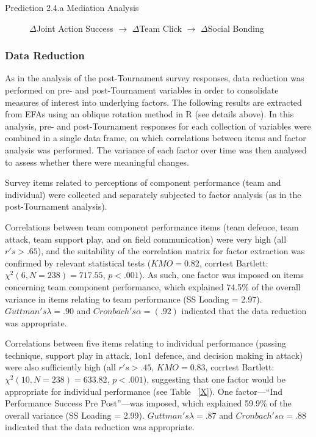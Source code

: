 \begin{description}
  \item[Prediction 2.4.a Mediation Analysis] $\Delta$Joint Action Success $\rightarrow$ $\Delta$Team Click $\rightarrow$ $\Delta$Social Bonding
\end{description}

\clearpage










\subsubsection{Data Reduction}
As in the analysis of the post-Tournament survey responses, data reduction was performed on pre- and post-Tournament variables in order to consolidate measures of interest into underlying factors. The following results are extracted from EFAs using an oblique rotation method in R (see details above). In this analysis, pre- and post-Tournament responses for each collection of variables were combined in a single data frame, on which correlations between items and factor analysis was performed.  The variance of each factor over time was then analysed to assess whether there were meaningful changes.


Survey items related to perceptions of component performance (team and individual) were collected and separately subjected to factor analysis (as in the post-Tournament analysis).

Correlations between team component performance items (team defence, team attack, team support play, and on field communication) were very high (all $r's > .65$), and the suitability of the correlation matrix for factor extraction was confirmed by relevant statistical tests ($KMO = 0.82$, corrtest Bartlett: $\chi^2(6, N = 238) = 717.55$, $p < .001$).  As such, one factor was imposed on items concerning team component performance, which explained 74.5\% of the overall variance in items relating to team performance (SS Loading = 2.97). $Guttman's \lambda =.90$ and $Cronbach's \alpha = (.92)$ indicated that the data reduction was appropriate.

Correlations between five items relating to individual performance (passing technique, support play in attack, 1on1 defence, and decision making in attack) were also sufficiently high (all $r's > .45$, $KMO = 0.83$, corrtest Bartlett: $\chi^2(10, N = 238) = 633.82$, $p < .001$), suggesting that one factor would be appropriate for individual performance (see Table ~\ref{X}).  One factor—``Ind Performance Success Pre Post''—was imposed, which explained 59.9\% of the overall variance (SS Loading = 2.99).  $Guttman's\lambda =.87$ and $Cronbach's \alpha = .88$ indicated that the data reduction was appropriate.


